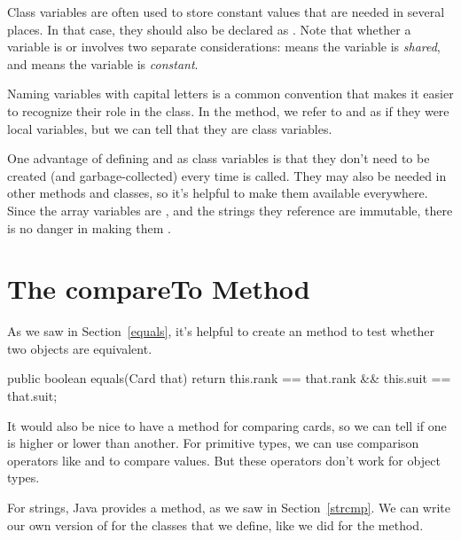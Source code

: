 
Class variables are often used to store constant values that are needed in several places.
In that case, they should also be declared as .
Note that whether a variable is  or  involves two separate considerations:
 means the variable is {\em shared}, and  means the variable is {\em constant}.

Naming  variables with capital letters is a common convention that makes it easier to recognize their role in the class.
In the  method, we refer to  and  as if they were local variables, but we can tell that they are class variables.

One advantage of defining  and  as class variables is that they don't need to be created (and garbage-collected) every time  is called.
They may also be needed in other methods and classes, so it's helpful to make them available everywhere.
Since the array variables are , and the strings they reference are immutable, there is no danger in making them .


\section{The compareTo Method}


As we saw in Section~\ref{equals}, it's helpful to create an  method to test whether two objects are equivalent.

\begin{code}
public boolean equals(Card that) {
    return this.rank == that.rank
        && this.suit == that.suit;
}
\end{code}


It would also be nice to have a method for comparing cards, so we can tell if one is higher or lower than another.
For primitive types, we can use comparison operators like \java{<} and \java{>} to compare values.
But these operators don't work for object types.

For strings, Java provides a  method, as we saw in Section~\ref{strcmp}.
We can write our own version of  for the classes that we define, like we did for the  method.

